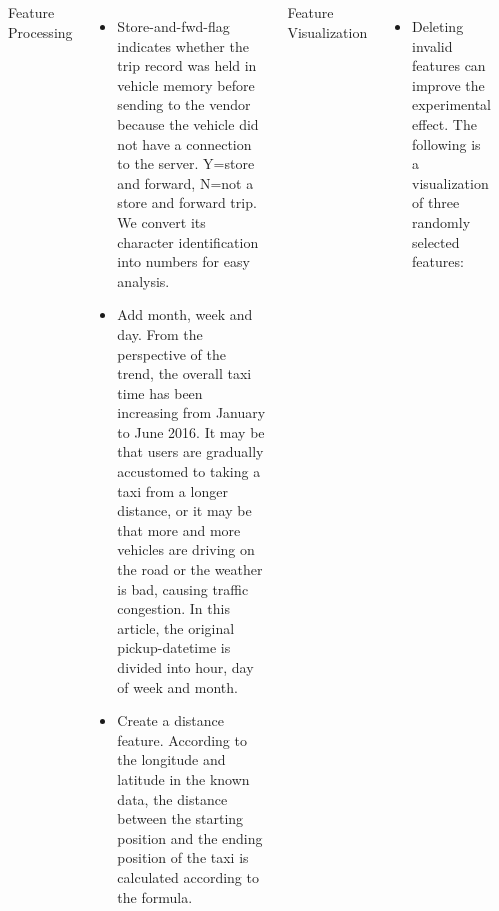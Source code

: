 \documentclass{tikzposter} %
\begin{document}
\begin{columns}
{\begin{itemize}
  \end{itemize}
  
\begin{description}
   \item[Feature Processing]
   \end{description}
   
 \begin{itemize}
    \item  
   Store-and-fwd-flag indicates whether the trip record was held in vehicle memory before sending to the vendor because the vehicle did not have a connection to the server. Y=store and forward, N=not a store and forward trip. We convert its character identification into numbers for easy analysis.
    \item 
   Add month, week and day. From the perspective of the trend, the overall taxi time has been increasing from January to June 2016. It may be that users are gradually accustomed to taking a taxi from a longer distance, or it may be that more and more vehicles are driving on the road or the weather is bad, causing traffic congestion. In this article, the original pickup-datetime is divided into hour, day of week and month.
    \item 
   Create a distance feature. According to the longitude and latitude in the known data, the distance between the starting position and the ending position of the taxi is calculated according to the formula.
   \end{itemize}
\begin{description}
   \item[Feature Visualization]
   \end{description}
   \begin{itemize}
    \item 
   Deleting invalid features can improve the experimental effect. The following is a visualization of three randomly selected features:
   \end{itemize}
   


}
\end{columns}
\end{document}
